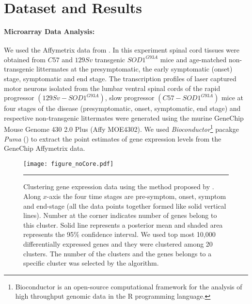 \section{Dataset and Results}

\paragraph{Microarray Data Analysis:}
We used the Affymetrix data from \cite{Nardo:2013}.  In this experiment spinal cord tissues were obtained from $C57$ and $129Sv$ transgenic $SOD1^{G93A}$ mice and age-matched non-transgenic littermates at the presymptomatic, the early symptomatic (onset) stage, symptomatic and end stage.  The transcription profiles of laser captured motor neurons isolated from the lumbar ventral spinal cords of the rapid progressor $(129Sv-SOD1^{G93A})$, slow progressor $(C57-SOD1^{G93A})$ mice at four stages of the disease (presymptomatic, onset, symptomatic, end stage) and respective non-transgenic littermates were generated using the murine GeneChip Mouse Genome 430 2.0 Plus (Affy MOE4302). We used \emph{Bioconductor}\footnote{Bioconductor is an open-source computational framework for the analysis of high throughput genomic data in the R programming language.} pacakge \emph{Puma} (\cite{puma}) to extract the point estimates of gene expression levels from the GeneChip Affymetrix data.

\begin{figure}
	\centering
		\texttt{[image: figure\_noCore.pdf]}
		\rule{35em}{0.5pt}
	\caption[Clustering gene expression data no coregionalization]
		{Clustering gene expression data using the method proposed by \cite{Hensman:2013}. Along $x$-axis the four time stages are pre-symptom, onset, symptom and end-stage (all the data points together formed like solid vertical lines). Number at the corner indicates number of genes belong to this cluster. Solid line represents a posterior mean and shaded area represents the 95\% confidence interval. We used top most 10,000 differentially expressed genes and they were clustered among 20 clusters. The number of the clusters and the genes belongs to a specific cluster was selected by the algorithm.}
	\label{fig:clsNoCoregionalization}
\end{figure}

